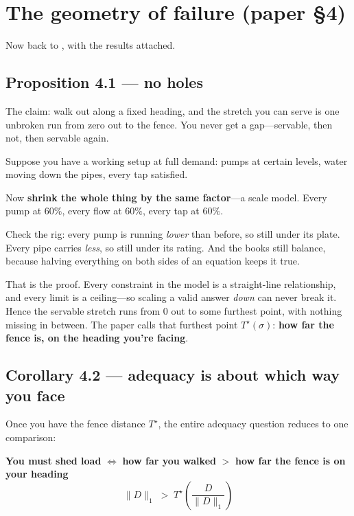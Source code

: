 \documentclass[11pt,a4paper]{article}
\begin{document}
\section{The geometry of failure (paper \S4)}

Now back to , with the results attached.

\subsection{Proposition 4.1 --- no holes}

The claim: walk out along a fixed heading, and the stretch you can serve is one
unbroken run from zero out to the fence. You never get a gap---servable, then
not, then servable again.

\begin{anchor}
Suppose you have a working setup at full demand: pumps at certain levels, water
moving down the pipes, every tap satisfied.

Now \textbf{shrink the whole thing by the same factor}---a scale model. Every
pump at $60\%$, every flow at $60\%$, every tap at $60\%$.

Check the rig: every pump is running \emph{lower} than before, so still under
its plate. Every pipe carries \emph{less}, so still under its rating. And the
books still balance, because halving everything on both sides of an equation
keeps it true.
\end{anchor}

That is the proof. Every constraint in the model is a straight-line
relationship, and every limit is a ceiling---so scaling a valid answer
\emph{down} can never break it. Hence the servable stretch runs from $0$ out to
some furthest point, with nothing missing in between. The paper calls that
furthest point $T^\star(\sigma)$: \textbf{how far the fence is, on the heading
you're facing}.

\subsection{Corollary 4.2 --- adequacy is about which way you face}

Once you have the fence distance $T^\star$, the entire adequacy question reduces
to one comparison:

\begin{center}
\begin{tcolorbox}[colback=softbg,colframe=inkclr,boxrule=0.6pt,arc=1pt,width=0.82\textwidth]
\centering
\textbf{You must shed load} $\iff$ \textbf{how far you walked} $>$
\textbf{how far the fence is on your heading}
\[
\lVert D \rVert_1 \;>\; T^\star\!\left(\frac{D}{\lVert D\rVert_1}\right)
\]
\end{tcolorbox}
\end{center}
\end{document}
